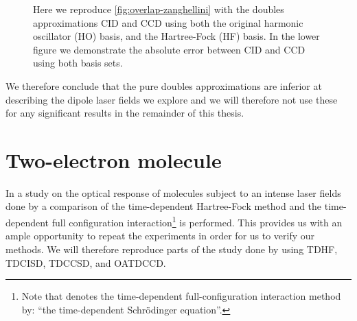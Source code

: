 \begin{figure}
            \caption{Here we reproduce \autoref{fig:overlap-zanghellini} with
            the doubles approximations CID and CCD using both the original
            harmonic oscillator (HO) basis, and the Hartree-Fock (HF) basis.
            In the lower figure we demonstrate the absolute error between CID
            and CCD using both basis sets.}
            \label{fig:overlap-doubles-zanghellini}
        \end{figure}

        We therefore conclude that the pure doubles approximations are inferior
        at describing the dipole laser fields we explore and we will therefore
        not use these for any significant results in the remainder of this
        thesis.



    \section{Two-electron molecule}
        In a study on the optical response of molecules subject to an
        intense laser fields done by \citeauthor{li_2005} \cite{li_2005} a
        comparison of the time-dependent Hartree-Fock method and the
        time-dependent full configuration interaction\footnote{%
            Note that \citeauthor{li_2005} denotes the time-dependent
            full-configuration interaction method by: ``the time-dependent
            Schrödinger equation''.
        } is performed.
        This provides us with an ample opportunity to repeat the
        experiments in order for us to verify our methods.
        We will therefore reproduce parts of the study done by
        \citeauthor{li_2005} using TDHF, TDCISD, TDCCSD, and OATDCCD.

